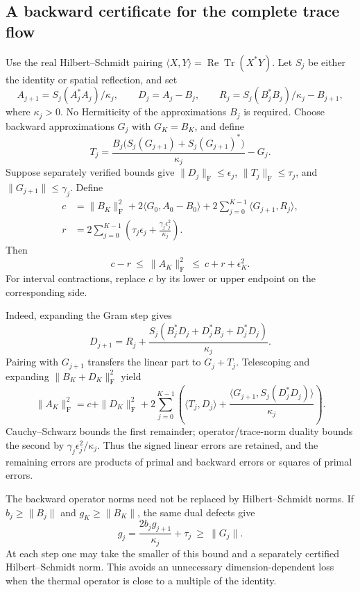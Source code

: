 \documentclass[11pt]{article}
\newcommand{\Tr}{\operatorname{Tr}}
\begin{document}
\subsection{A backward certificate for the complete trace flow}
Use the real Hilbert--Schmidt pairing
$\langle X,Y\rangle=\operatorname{Re}\Tr(X^*Y)$.
Let $S_j$ be either the identity or spatial reflection, and set
\[
 A_{j+1}=S_j(A_j^*A_j)/\kappa_j,\qquad
 D_j=A_j-B_j,\qquad
 R_j=S_j(B_j^*B_j)/\kappa_j-B_{j+1},
\]
where $\kappa_j>0$. No Hermiticity of the approximations $B_j$ is
required. Choose backward approximations $G_j$ with $G_K=B_K$, and define
\[
 T_j=\frac{B_j\bigl(S_j(G_{j+1})+S_j(G_{j+1})^*\bigr)}{\kappa_j}-G_j.
\]
Suppose separately verified bounds give
$\|D_j\|_{\mathrm F}\le\epsilon_j$,
$\|T_j\|_{\mathrm F}\le\tau_j$, and
$\|G_{j+1}\|\le\gamma_j$. Define
\begin{align*}
 c&=\|B_K\|_{\mathrm F}^2+2\langle G_0,A_0-B_0\rangle
       +2\sum_{j=0}^{K-1}\langle G_{j+1},R_j\rangle,\\
 r&=2\sum_{j=0}^{K-1}
       \left(\tau_j\epsilon_j+\frac{\gamma_j\epsilon_j^2}{\kappa_j}\right).
\end{align*}
Then
\[
 \boxed{c-r\ \le\ \|A_K\|_{\mathrm F}^2
          \ \le\ c+r+\epsilon_K^2.}
\]
For interval contractions, replace $c$ by its lower or upper endpoint
on the corresponding side.

Indeed, expanding the Gram step gives
\[
 D_{j+1}=R_j+
 \frac{S_j(B_j^*D_j+D_j^*B_j+D_j^*D_j)}{\kappa_j}.
\]
Pairing with $G_{j+1}$ transfers the linear part to $G_j+T_j$.
Telescoping and expanding $\|B_K+D_K\|_{\mathrm F}^2$ yield
\[
 \|A_K\|_{\mathrm F}^2=c+\|D_K\|_{\mathrm F}^2
 +2\sum_{j=0}^{K-1}\left(
 \langle T_j,D_j\rangle+
 \frac{\langle G_{j+1},S_j(D_j^*D_j)\rangle}{\kappa_j}\right).
\]
Cauchy--Schwarz bounds the first remainder; operator/trace-norm duality
bounds the second by $\gamma_j\epsilon_j^2/\kappa_j$.
Thus the signed linear errors are retained, and the remaining errors
are products of primal and backward errors or squares of primal errors.

The backward operator norms need not be replaced by Hilbert--Schmidt
norms. If $b_j\ge\|B_j\|$ and $g_K\ge\|B_K\|$, the same dual defects give
\[
 g_j=\frac{2b_jg_{j+1}}{\kappa_j}+\tau_j\ \ge\ \|G_j\|.
\]
At each step one may take the smaller of this bound and a separately
certified Hilbert--Schmidt norm. This avoids an unnecessary
dimension-dependent loss when the thermal operator is close to a
multiple of the identity.
\end{document}
